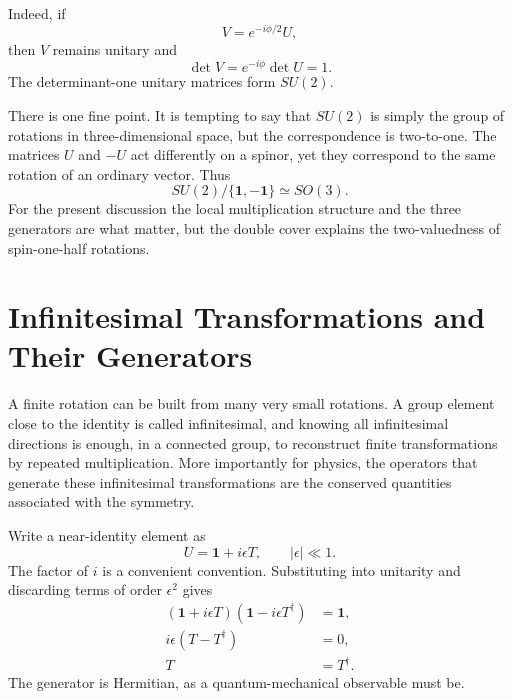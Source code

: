 Indeed, if
\begin{equation}
V=e^{-i\phi/2}U,
\end{equation}
then \(V\) remains unitary and
\begin{equation}
\det V=e^{-i\phi}\det U=1.
\end{equation}
The determinant-one unitary matrices form \(SU(2)\).

There is one fine point. It is tempting to say that \(SU(2)\) is simply the
group of rotations in three-dimensional space, but the correspondence is
two-to-one. The matrices \(U\) and \(-U\) act differently on a spinor, yet they
correspond to the same rotation of an ordinary vector. Thus
\begin{equation}
SU(2)/\{\boldsymbol 1,-\boldsymbol 1\}\simeq SO(3).
\end{equation}
For the present discussion the local multiplication structure and the three
generators are what matter, but the double cover explains the two-valuedness of
spin-one-half rotations.

\section{Infinitesimal Transformations and Their Generators}

A finite rotation can be built from many very small rotations. A group element
close to the identity is called infinitesimal, and knowing all infinitesimal
directions is enough, in a connected group, to reconstruct finite
transformations by repeated multiplication. More importantly for physics, the
operators that generate these infinitesimal transformations are the conserved
quantities associated with the symmetry.

Write a near-identity element as
\begin{equation}
U=\boldsymbol 1+i\epsilon T,
\qquad |\epsilon|\ll1.
\label{eq:l4-infinitesimal-u}
\end{equation}
The factor of \(i\) is a convenient convention. Substituting into unitarity and
discarding terms of order \(\epsilon^2\) gives
\begin{align}
(\boldsymbol 1+i\epsilon T)
(\boldsymbol 1-i\epsilon T^\dagger)&=\boldsymbol 1,
\\
i\epsilon(T-T^\dagger)&=0,
\\
T&=T^\dagger.
\label{eq:l4-hermitian-generator}
\end{align}
The generator is Hermitian, as a quantum-mechanical observable must be.


